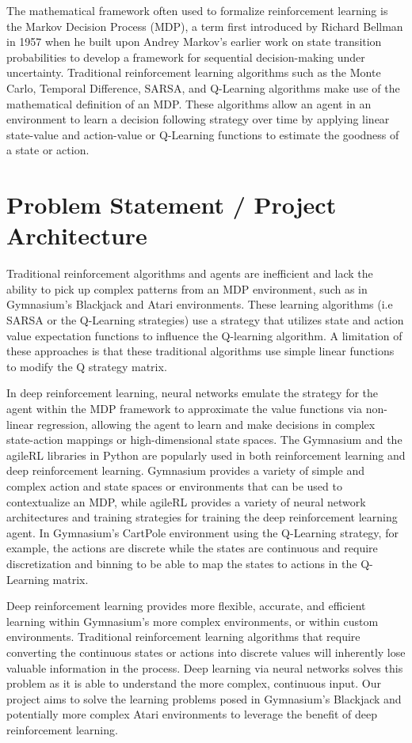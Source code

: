 \documentclass[compsoc]{IEEEtran}
\begin{document}
The mathematical framework often used to formalize reinforcement learning is the Markov Decision Process (MDP), a term first introduced by Richard Bellman in 1957 when he built upon Andrey Markov's earlier work on state transition probabilities to develop a framework for sequential decision-making under uncertainty. Traditional reinforcement learning algorithms such as the Monte Carlo, Temporal Difference, SARSA, and Q-Learning algorithms make use of the mathematical definition of an MDP. These algorithms allow an agent in an environment to learn a decision following strategy over time by applying linear state-value and action-value or Q-Learning functions to estimate the goodness of a state or action. 

\section{Problem Statement / Project Architecture}\label{sec:problem}

Traditional reinforcement algorithms and agents are inefficient and lack the ability to pick up complex patterns from an MDP environment, such as in Gymnasium’s Blackjack and Atari environments. These learning algorithms (i.e SARSA or the Q-Learning strategies) use a strategy that utilizes state and action value expectation functions to influence the Q-learning algorithm. A limitation of these approaches is that these traditional algorithms use simple linear functions to modify the Q strategy matrix. 

In deep reinforcement learning, neural networks emulate the strategy for the agent within the MDP framework to approximate the value functions via non-linear regression, allowing the agent to learn and make decisions in complex state-action mappings or high-dimensional state spaces. The Gymnasium and the agileRL libraries in Python are popularly used in both reinforcement learning and deep reinforcement learning. Gymnasium provides a variety of simple and complex action and state spaces or environments that can be used to contextualize an MDP, while agileRL provides a variety of neural network architectures and training strategies for training the deep reinforcement learning agent. In Gymnasium’s CartPole environment using the Q-Learning strategy, for example, the actions are discrete while the states are continuous and require discretization and binning to be able to map the states to actions in the Q-Learning matrix.

Deep reinforcement learning provides more flexible, accurate, and efficient learning within Gymnasium’s more complex environments, or within custom environments. Traditional reinforcement learning algorithms that require converting the continuous states or actions into discrete values will inherently lose valuable information in the process. Deep learning via neural networks solves this problem as it is able to understand the more complex, continuous input. Our project aims to solve the learning problems posed in Gymnasium’s Blackjack and potentially more complex Atari environments to leverage the benefit of deep reinforcement learning.
\end{document}
